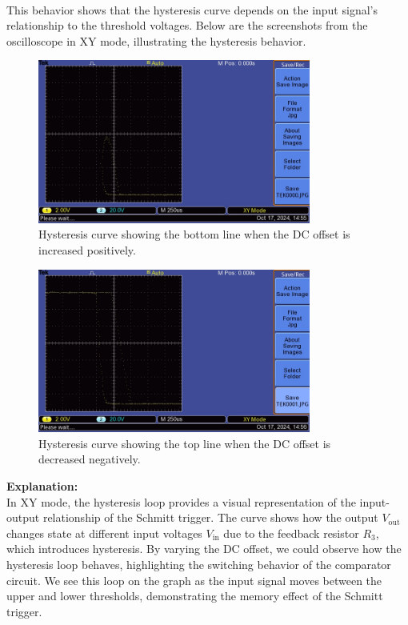 \documentclass{article}
\begin{document}
\\
This behavior shows that the hysteresis curve depends on the input signal's relationship to the threshold voltages. Below are the screenshots from the oscilloscope in XY mode, illustrating the hysteresis behavior.

\begin{figure}[H]
    \centering
    \includegraphics[width=0.8\textwidth]{img/Lab 8/5_1.JPG} %
    \caption{Hysteresis curve showing the bottom line when the DC offset is increased positively.}
\end{figure}

\begin{figure}[H]
    \centering
    \includegraphics[width=0.8\textwidth]{img/Lab 8/5_2.JPG} %
    \caption{Hysteresis curve showing the top line when the DC offset is decreased negatively.}
\end{figure}

\textbf{Explanation:} \\
In XY mode, the hysteresis loop provides a visual representation of the 
input-output relationship of the Schmitt trigger. The curve shows how the 
output \( V_{\text{out}} \) changes state at different input voltages 
\( V_{\text{in}} \) due to the feedback resistor \( R_3 \), which introduces 
hysteresis. By varying the DC offset, we could observe how the hysteresis 
loop behaves, highlighting the switching behavior of the comparator circuit. 
We see this loop on the graph as the input signal moves between the upper 
and lower thresholds, demonstrating the memory effect of the Schmitt trigger.
\end{document}
